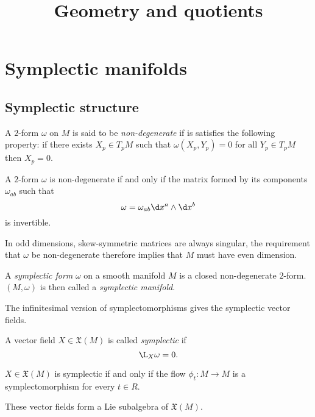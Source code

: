 \documentclass{worksheetclass}
\title{Geometry and quotients}
\begin{document}
\maketitle

\tableofcontents

\section{Symplectic manifolds}

    \subsection{Symplectic structure}
    
        \begin{defn}
            A $2$-form $\omega$ on $M$ is said to be \emph{non-degenerate} if is satisfies the following property: if there exists $X_p\in T_pM$ such that $\omega(X_p,Y_p)=0$ for all $Y_p\in T_pM$ then $X_p=0$.
        \end{defn}
        
        \begin{prop}
            A $2$-form $\omega$ is non-degenerate if and only if the matrix formed by its components $\omega_{ab}$ such that
            \begin{equation*}
                \omega=\omega_{ab}\d x^a\wedge\d x^b
            \end{equation*}
            is invertible.
        \end{prop}
        
        In odd dimensions, skew-symmetric matrices are always singular, the requirement that $\omega$ be non-degenerate therefore implies that $M$ must have even dimension.
    
        \begin{defn}
            A \emph{symplectic form} $\omega$ on a smooth manifold $M$ is a closed non-degenerate $2$-form. $(M,\omega)$ is then called a \emph{symplectic manifold}.
        \end{defn}
        The infinitesimal version of symplectomorphisms gives the symplectic vector fields.
        \begin{defn}
            A vector field $X\in\mathfrak{X}(M)$ is called \emph{symplectic} if
            \begin{equation*}
                \L_X\omega = 0.
            \end{equation*}
        \end{defn}
        \begin{prop}
            $X\in\mathfrak{X}(M)$ is symplectic if and only if the flow $\phi_t:M\to M$ is a symplectomorphism for every $t\in R$.
        \end{prop}
        These vector fields form a Lie subalgebra of $\mathfrak{X}(M)$.
\end{document}
